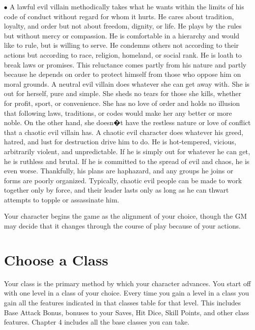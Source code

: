 \begin{list}{$\bullet$}{\itemspace}
	  A lawful evil villain methodically takes what he wants within the limits of his code of conduct without regard for whom it hurts. He cares about tradition, loyalty, and order but not about freedom, dignity, or life. He plays by the rules but without mercy or compassion. He is comfortable in a hierarchy and would like to rule, but is willing to serve. He condemns others not according to their actions but according to race, religion, homeland, or social rank. He is loath to break laws or promises. This reluctance comes partly from his nature and partly because he depends on order to protect himself from those who oppose him on moral grounds.
	 A neutral evil villain does whatever she can get away with. She is out for herself, pure and simple. She sheds no tears for those she kills, whether for profit, sport, or convenience. She has no love of order and holds no illusion that following laws, traditions, or codes would make her any better or more noble. On the other hand, she doesn�t have the restless nature or love of conflict that a chaotic evil villain has. 
	 A chaotic evil character does whatever his greed, hatred, and lust for destruction drive him to do. He is hot-tempered, vicious, arbitrarily violent, and unpredictable. If he is simply out for whatever he can get, he is ruthless and brutal. If he is committed to the spread of evil and chaos, he is even worse. Thankfully, his plans are haphazard, and any groups he joins or forms are poorly organized. Typically, chaotic evil people can be made to work together only by force, and their leader lasts only as long as he can thwart attempts to topple or assassinate him. 
\end{list}
\vspace*{10pt}
Your character begins the game as the alignment of your choice, though the GM may decide that it changes through the course of play because of your actions.
 
\section{Choose a Class}

Your class is the primary method by which your character advances.  You start off with one level in a class of your choice.  Every time you gain a level in a class you gain all the features indicated in that classes table for that level.  This includes Base Attack Bonus, bonuses to your Saves, Hit Dice, Skill Points, and other class features.  Chapter 4 includes all the base classes you can take.

